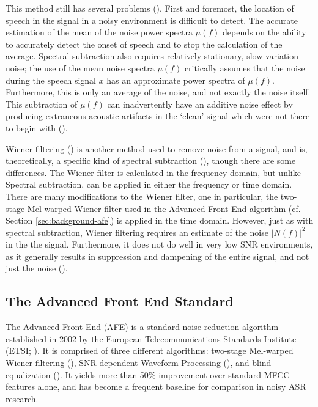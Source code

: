 This method still has several problems (\cite{li:14}). First and foremost, the location of speech in the signal in a noisy environment is difficult to detect.  The accurate estimation of the mean of the noise power spectra $\mu(f)$ depends on the ability to accurately detect the onset of speech and to stop the calculation of the average.  Spectral subtraction also requires relatively stationary, slow-variation noise; the use of the mean noise spectra $\mu(f)$ critically assumes that the noise during the speech signal $x$ has an approximate power spectra of $\mu(f)$.  Furthermore, this is only an average of the noise, and not exactly the noise itself.  This subtraction of $\mu(f)$ can inadvertently have an additive noise effect by producing extraneous acoustic artifacts in the `clean' signal which were not there to begin with (\cite{berouti:79}).

Wiener filtering (\cite{lim:79}) is another method used to remove noise from a signal, and is, theoretically, a specific kind of spectral subtraction (\cite{agarwal:99}), though there are some differences. The Wiener filter is calculated in the frequency domain, but unlike Spectral subtraction, can be applied in either the frequency or time domain. There are many modifications to the Wiener filter, one in particular, the two-stage Mel-warped Wiener filter used in the Advanced Front End algorithm (cf. Section \ref{sec:background-afe}) is applied in the time domain.
However, just as with spectral subtraction, Wiener filtering requires an estimate of the noise $|N(f)|^2$ in the the signal.  Furthermore, it does not do well in very low SNR environments, as it generally results in suppression and dampening of the entire signal, and not just the noise (\cite{li:14}).


\DIFdelbegin \subsubsection{}%
\addtocounter{subsubsection}{-1}%
\DIFdelend \DIFaddbegin \subsection{The Advanced Front End Standard}\DIFaddend \label{sec:background-afe}

The Advanced Front End (AFE) is a standard noise-reduction algorithm established in 2002 by the European Telecommunications Standards Institute (ETSI; \cite{etsi:02}).  It is comprised of three different algorithms: two-stage Mel-warped Wiener filtering (\cite{agarwal:99}), SNR-dependent Waveform Processing (\cite{macho:01}), and blind equalization (\cite{mauuary:98}).  It yields more than 50\% improvement over standard MFCC features alone, and has become a frequent baseline for comparison in noisy ASR research.

